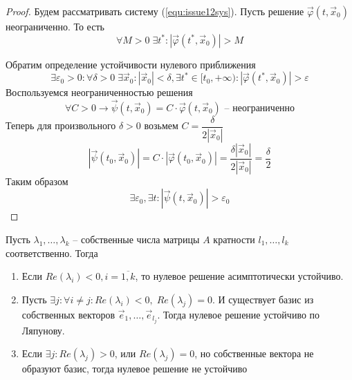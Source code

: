 \begin{proof}
	Будем рассматривать систему (\ref{equ:issue12sys}). Пусть решение $\vec{\varphi}(t, \vec{x}_0)$ неограниченно. То есть 
	\[
	\forall M>0 \; \exists t^*:|\vec{\varphi}(t^*, \vec{x}_0)|>M
	\]
	
	Обратим определение устойчивости нулевого приближения 
	\[
	\exists \varepsilon_0>0: \forall \delta>0 \; \exists \vec{x}_0: |\vec{x}_0|<\delta, \exists t^*\in[t_0, +\infty): |\vec{\varphi}(t^*, \vec{x}_0)|>\varepsilon
	\]
	Воспользуемся неограниченностью решения
	\[
	\forall C>0 \to \vec{\psi}(t, \vec{x}_0) = C\cdot\vec{\varphi}(t, \vec{x}_0) \text{ -- неограниченно} 
	\]
	Теперь для произвольного $\delta >0 $ возьмем $C = \dfrac{\delta}{2|\vec{x}_0|}$
	\[
	|\vec{\psi}(t_0, \vec{x}_0)| = C\cdot|\vec{\varphi}(t_0, \vec{x}_0)| = \frac{\delta |\vec{x}_0|}{2|\vec{x}_0|} = \frac{\delta}{2}
	\]
	Таким образом
	\[
	\exists \varepsilon_0, \exists t: 	|\vec{\psi}(t, \vec{x}_0)| > \varepsilon_0
	\]
\end{proof}

\begin{theorem}
	Пусть $\lambda_1, \dots, \lambda_k$ -- собственные числа матрицы $A$ кратности $l_1, \dots, l_k$ соответственно. Тогда
	\begin{enumerate}
		\item Если $Re(\lambda_i)<0, i=\overline{1, k}$, то нулевое решение асимптотически устойчиво.
		\item Пусть $\exists j: \forall i\neq j :Re(\lambda_i) < 0, \; Re(\lambda_j) = 0$. И существует базис из собственных векторов $\vec{e}_{1}, \dots, \vec{e}_{l_j}$. Тогда нулевое решение устойчиво по Ляпунову.
		\item Если $\exists j: Re(\lambda_j) > 0$, или $Re(\lambda_j) = 0$, но собственные вектора не образуют базис, тогда нулевое решение не устойчиво
	\end{enumerate}
\end{theorem}

